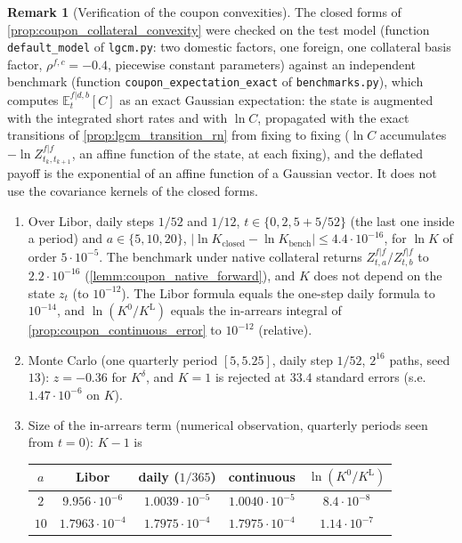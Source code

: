 \documentclass[11pt,english]{amsart}
\newcommand{\EE}{\mathbb{E}}
\theoremstyle{definition}
\newtheorem{rema}{Remark}
\begin{document}
\begin{rema}[Verification of the coupon convexities]\label{rema:coupon_convexity_verification}
The closed forms of \autoref{prop:coupon_collateral_convexity} were checked on the test model (function \texttt{default\_model} of \texttt{lgcm.py}: two domestic factors, one foreign, one collateral basis factor, $\rho^{f,c} = -0.4$, piecewise constant parameters) against an independent benchmark (function \texttt{coupon\_expectation\_exact} of \texttt{benchmarks.py}), which computes $\EE^{f|d,b}_t[C]$ as an exact Gaussian expectation: the state is augmented with the integrated short rates and with $\ln C$, propagated with the exact transitions of \autoref{prop:lgcm_transition_rn} from fixing to fixing ($\ln C$ accumulates $-\ln Z^{f|f}_{t_k,t_{k+1}}$, an affine function of the state, at each fixing), and the deflated payoff is the exponential of an affine function of a Gaussian vector. It does not use the covariance kernels of the closed forms.
\begin{enumerate}
\item Over Libor, daily steps $1/52$ and $1/12$, $t\in\{0, 2, 5+5/52\}$ (the last one inside a period) and $a\in\{5,10,20\}$, $|\ln K_{\mathrm{closed}}-\ln K_{\mathrm{bench}}|\le4.4\cdot10^{-16}$, for $\ln K$ of order $5\cdot10^{-5}$. The benchmark under native collateral returns $Z^{f|f}_{t,a}/Z^{f|f}_{t,b}$ to $2.2\cdot10^{-16}$ (\autoref{lemm:coupon_native_forward}), and $K$ does not depend on the state $z_t$ (to $10^{-12}$). The Libor formula equals the one-step daily formula to $10^{-14}$, and $\ln(K^0/K^{\mathrm{L}})$ equals the in-arrears integral of \autoref{prop:coupon_continuous_error} to $10^{-12}$ (relative).
\item Monte Carlo (one quarterly period $[5,5.25]$, daily step $1/52$, $2^{16}$ paths, seed $13$): $z = -0.36$ for $K^\delta$, and $K = 1$ is rejected at $33.4$ standard errors (s.e.\ $1.47\cdot10^{-6}$ on $K$).
\item Size of the in-arrears term (numerical observation, quarterly periods seen from $t=0$): $K-1$ is
\begin{center}
\begin{tabular}{|c|c|c|c|c|}
\hline
$a$ & Libor & daily ($1/365$) & continuous & $\ln(K^0/K^{\mathrm{L}})$ \\
\hline
$2$  & $9.956\cdot10^{-6}$ & $1.0039\cdot10^{-5}$ & $1.0040\cdot10^{-5}$ & $8.4\cdot10^{-8}$ \\
$10$ & $1.7963\cdot10^{-4}$ & $1.7975\cdot10^{-4}$ & $1.7975\cdot10^{-4}$ & $1.14\cdot10^{-7}$ \\

\end{tabular}
\end{center}
\end{enumerate}
\end{rema}
\end{document}

